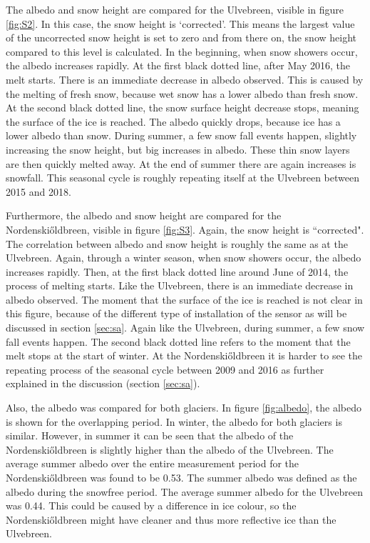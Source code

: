 \documentclass[11pt]{report}
\begin{document}
The albedo and snow height are compared for the Ulvebreen, visible in figure \ref{fig:S2}. In this case, the snow height is `corrected'. This means the largest value of the uncorrected snow height is set to zero and from there on, the snow height compared to this level is calculated. In the beginning, when snow showers occur, the albedo increases rapidly. At the first black dotted line, after May 2016, the melt starts. There is an immediate decrease in albedo observed. This is caused by the melting of fresh snow, because wet snow has a lower albedo than fresh snow. At the second black dotted line, the snow surface height decrease stops, meaning the surface of the ice is reached. The albedo quickly drops, because ice has a lower albedo than snow. During summer, a few snow fall events happen, slightly increasing the snow height, but big increases in albedo. These thin snow layers are then quickly melted away. At the end of summer there are again increases is snowfall. This seasonal cycle is roughly repeating itself at the Ulvebreen between 2015 and 2018. 

\newpage
Furthermore, the albedo and snow height are compared for the Nordenski\H{o}ldbreen, visible in figure \ref{fig:S3}. Again, the snow height is ``corrected". The correlation between albedo and snow height is roughly the same as at the Ulvebreen. Again, through a winter season, when snow showers occur, the albedo increases rapidly. Then, at the first black dotted line around June of 2014, the process of melting starts. Like the Ulvebreen, there is an immediate decrease in albedo observed. The moment that the surface of the ice is reached is not clear in this figure, because of the different type of installation of the sensor as will be discussed in section \ref{sec:sa}. Again like the Ulvebreen, during summer, a few snow fall events happen. The second black dotted line refers to the moment that the melt stops at the start of winter. At the Nordenski\H{o}ldbreen it is harder to see the repeating process of the seasonal cycle between 2009 and 2016 as further explained in the discussion (section \ref{sec:sa}).

Also, the albedo was compared for both glaciers. In figure \ref{fig:albedo}, the albedo is shown for the overlapping period. In winter, the albedo for both glaciers is similar. However, in summer it can be seen that the albedo of the Nordenski\H{o}ldbreen is slightly higher than the albedo of the Ulvebreen. The average summer albedo over the entire measurement period for the Nordenski\H{o}ldbreen was found to be 0.53. The summer albedo was defined as the albedo during the snowfree period. The average summer albedo for the Ulvebreen was 0.44. This could be caused by a difference in ice colour, so the Nordenski\H{o}ldbreen might have cleaner and thus more reflective ice than the Ulvebreen. 
\end{document}
